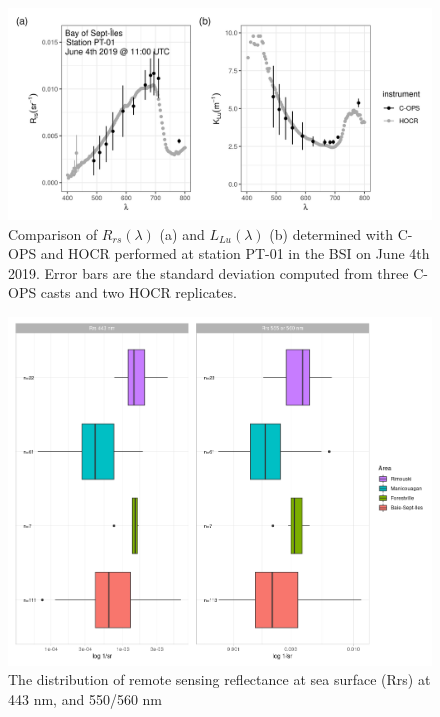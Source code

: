 \documentclass[essd, manuscript]{copernicus}
\begin{document}
\begin{figure}
    \centering
    \includegraphics[width=18cm]{Figures/Rrs_HOCR-COPS-PT01-June4th2019.png}
    \caption{Comparison of $R_{rs}(\lambda)$ (a) and  $L_{Lu}(\lambda)$ (b) determined with C-OPS and HOCR performed at station PT-01 in the BSI on June 4th 2019. Error bars are the standard deviation computed from three C-OPS casts and two HOCR replicates. }
    \label{fig:PT01}
\end{figure}



\begin{figure}[t]
    \includegraphics[width=12cm]{Figures/boxplot_Rrs.png}
    \caption{The distribution of remote sensing reflectance at sea surface (Rrs) at 443 nm, and 550/560 nm }
    \label{fig:Rrs443}
\end{figure}
\end{document}
